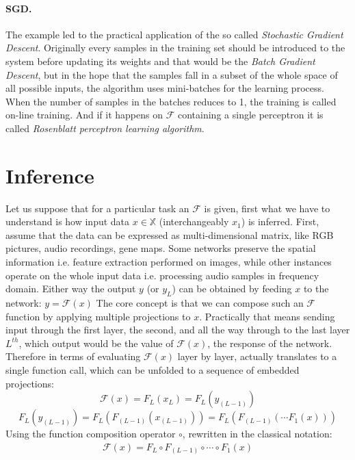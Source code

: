 \paragraph{SGD.} The example led to the practical application of the so called \emph{Stochastic Gradient Descent}.
Originally every samples in the training set should be introduced to the system before updating its weights and that would be the \emph{Batch Gradient Descent}, but in  the hope that the samples fall in a subset of the whole space of all possible inputs, the algorithm uses mini-batches for the learning process. When the number of samples in the batches reduces to 1, the training is called on-line training. And if it happens on $\mathcal{F}$ containing a single perceptron it is called \emph{Rosenblatt perceptron learning algorithm}.


\section{Inference}
Let us suppose that for a particular task an $\mathcal{F}$ is given, first what we have to understand is how input data 
$x \in \mathbb{X}$ (interchangeably $x_1$) is inferred.
First, assume that the data can be expressed as multi-dimensional matrix, like RGB pictures, audio recordings, gene maps.
Some networks preserve the spatial information i.e. feature extraction performed on images, 
while other instances operate on the whole input data i.e. processing audio samples in frequency domain.
Either way the output $y$ (or $y_L$) can be obtained by feeding $x$ to the network: 
$ y = \mathcal{F}(x)$
The core concept is that we can compose such an $\mathcal{F}$ function by applying multiple projections to $x$.
Practically that means sending input through the first layer, the second, and all the way through to the last layer $L^{th}$, which output would be the value of $\mathcal{F}(x)$, the response of the network.
Therefore in terms of evaluating $\mathcal{F}(x)$ layer by layer, actually translates to a single function call, which can be unfolded to a sequence of embedded projections:
$$
    \mathcal{F}(x) = F_L \left( x_L \right) = F_L \left( y_{(L-1)} \right)
$$
$$
    F_L \left( y_{(L-1)} \right) = 
    F_L \left( F_{(L-1)} \left( x_{(L-1)} \right) \right) = F_L \left( F_{(L-1)}\left( \cdots F_1(x)\right)\right)
$$
Using the function composition operator $\circ$, rewritten in the classical notation:
\begin{equation}\label{eq:forward}
\begin{split}
    \mathcal{F}(x) = F_L \circ F_{(L-1)} \circ \cdots \circ F_1(x)
\end{split}
\end{equation}

